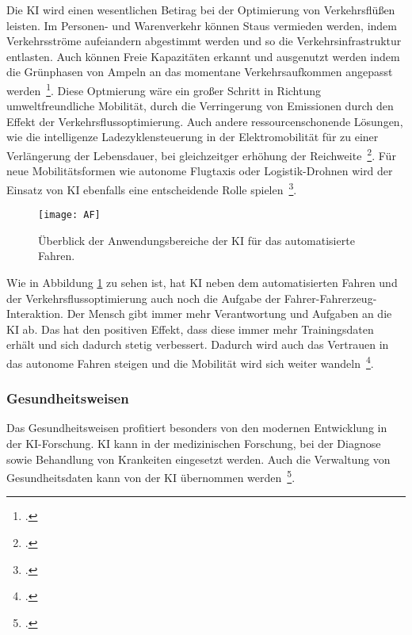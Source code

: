 Die \ac{KI} wird einen wesentlichen Betirag bei der Optimierung von Verkehrsflüßen leisten. Im Personen- und Warenverkehr können Staus vermieden werden, indem Verkehrsströme aufeiandern 
abgestimmt werden und so die Verkehrsinfrastruktur entlasten. Auch können Freie Kapazitäten erkannt und ausgenutzt werden indem die Grünphasen von Ampeln an das momentane
Verkehrsaufkommen angepasst werden~\footcite[\vglf][]{Wittpahl.2018}. Diese Optmierung wäre ein großer Schritt in Richtung umweltfreundliche Mobilität, durch die 
Verringerung von Emissionen durch den Effekt der Verkehrsflussoptimierung. Auch andere ressourcenschonende Lösungen, wie die intelligenze Ladezyklensteuerung in der Elektromobilität
für zu einer Verlängerung der Lebensdauer, bei gleichzeitger erhöhung der Reichweite~\footcite[\vglf][]{Wittpahl.2018}.
Für neue Mobilitätsformen wie autonome Flugtaxis oder Logistik-Drohnen wird der Einsatz von KI ebenfalls eine entscheidende Rolle spielen~\footcite[][]{Wittpahl.2018}.

\begin{figure}[H]
    \caption{Überblick der Anwendungsbereiche der KI für das automatisierte Fahren.}
    \texttt{[image: AF]}
    \label{fig:af}
    \\
    \cite[Quelle: ][]{Wittpahl.2018}
\end{figure}

Wie in Abbildung \ref{fig:af} zu sehen ist, hat \ac{KI} neben dem automatisierten Fahren und der Verkehrsflussoptimierung auch noch die Aufgabe der Fahrer-Fahrerzeug-Interaktion. Der Mensch 
gibt immer mehr Verantwortung und Aufgaben an die \ac{KI} ab. Das hat den positiven Effekt, dass diese immer mehr Trainingsdaten erhält und sich dadurch stetig verbessert.
Dadurch wird auch das Vertrauen in das autonome Fahren steigen und die Mobilität wird sich weiter wandeln~\footcite[\vglf][]{Wittpahl.2018}.

\subsubsection{Gesundheitsweisen}

Das Gesundheitsweisen profitiert besonders von den modernen Entwicklung in der \ac{KI}-Forschung. \ac{KI} kann in der medizinischen Forschung, bei der Diagnose sowie Behandlung 
von Krankeiten eingesetzt werden. Auch die Verwaltung von Gesundheitsdaten kann von der \ac{KI} übernommen werden~\footcite[\vglf][]{Robot.2023}.


